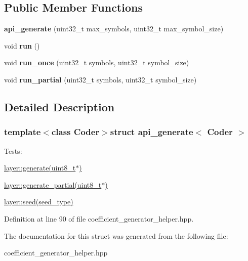\subsection*{Public Member Functions}
\begin{DoxyCompactItemize}
\item 
\hypertarget{structapi__generate_ae78799364014b4bd3bda6f03ad771e34}{{\bfseries api\-\_\-generate} (uint32\-\_\-t max\-\_\-symbols, uint32\-\_\-t max\-\_\-symbol\-\_\-size)}\label{structapi__generate_ae78799364014b4bd3bda6f03ad771e34}

\item 
\hypertarget{structapi__generate_ae8cdd30aaf89f1f816357f20aa7d7585}{void {\bfseries run} ()}\label{structapi__generate_ae8cdd30aaf89f1f816357f20aa7d7585}

\item 
\hypertarget{structapi__generate_a00799e0712dcd1931227a29a9c036903}{void {\bfseries run\-\_\-once} (uint32\-\_\-t symbols, uint32\-\_\-t symbol\-\_\-size)}\label{structapi__generate_a00799e0712dcd1931227a29a9c036903}

\item 
\hypertarget{structapi__generate_a70829281461287a14d2130bcb864d424}{void {\bfseries run\-\_\-partial} (uint32\-\_\-t symbols, uint32\-\_\-t symbol\-\_\-size)}\label{structapi__generate_a70829281461287a14d2130bcb864d424}

\end{DoxyCompactItemize}


\subsection{Detailed Description}
\subsubsection*{template$<$class Coder$>$struct api\-\_\-generate$<$ Coder $>$}

Tests\-:
\begin{DoxyItemize}
\item \hyperlink{group__coefficient__generator__api_gaf9f828a98483445a8ccf785e3a671cb3}{layer\-::generate(uint8\-\_\-t$\ast$)}
\item \hyperlink{group__coefficient__generator__api_ga295e2fc5a74a92ef2281549a31379ba5}{layer\-::generate\-\_\-partial(uint8\-\_\-t$\ast$)}
\item \hyperlink{group__coefficient__generator__api_ga4afaaccc0d847e2c8ba021cc4e8c9672}{layer\-::seed(seed\-\_\-type)} 
\end{DoxyItemize}

Definition at line 90 of file coefficient\-\_\-generator\-\_\-helper.\-hpp.



The documentation for this struct was generated from the following file\-:\begin{DoxyCompactItemize}
\item 
coefficient\-\_\-generator\-\_\-helper.\-hpp\end{DoxyCompactItemize}
